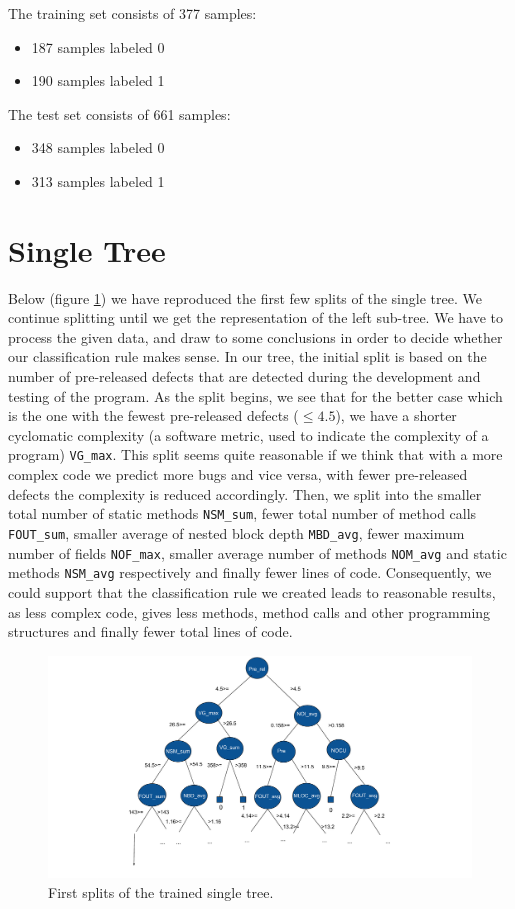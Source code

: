 \documentclass[a4paper,11pt]{article}
\begin{document}
The training set consists of 377 samples:
\begin{itemize}
\item 187 samples labeled 0
\item 190 samples labeled 1
\end{itemize}

The test set consists of 661 samples:
\begin{itemize}
\item 348 samples labeled 0
\item 313 samples labeled 1
\end{itemize}

\section{Single Tree}
Below (figure \ref{fig: tree1}) we have reproduced the first few splits of the single tree. We continue splitting until we get the representation of the left sub-tree. We have to process the given data, and draw to some conclusions in order to decide whether our classification rule makes sense. In our tree, the initial split is based on the number of pre-released defects that are detected during the development and testing of the program. As the split begins, we see that for the better case which is the one with the fewest pre-released defects ($\leq 4.5$), we have a shorter cyclomatic complexity (a software metric, used to indicate the complexity of a program) \verb|VG_max|. This split seems quite reasonable if we think that with a more complex code we predict more bugs and vice versa, with fewer pre-released defects the complexity is reduced accordingly. Then, we split into the smaller total number of static methods \verb|NSM_sum|, fewer total number of method calls \verb|FOUT_sum|, smaller average of nested block depth \verb|MBD_avg|, fewer maximum number of fields \verb|NOF_max|, smaller average number of methods \verb|NOM_avg| and static methods \verb|NSM_avg| respectively and finally fewer lines of code. Consequently, we could support that the classification rule we created leads to reasonable results, as less complex code, gives less methods, method calls and other programming structures and finally fewer total lines of code. 

\begin{figure}[h!]
\includegraphics[width=\textwidth]{Tree1.pdf}
\caption{First splits of the trained single tree.}
\label{fig: tree1}
\end{figure}
\end{document}
